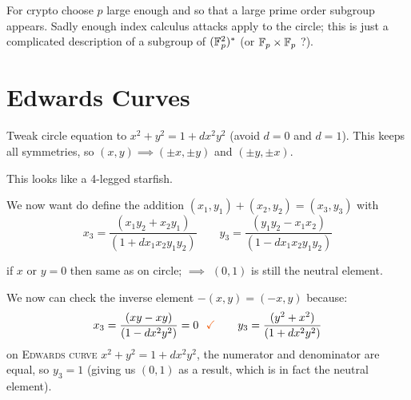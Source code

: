 For crypto choose $p$ large enough and so that a large prime order subgroup appears. Sadly enough index calculus attacks apply to the circle; this is just a complicated description of a subgroup of $(\mathbb{F}_p^2)^{\ast}$ (or $\mathbb{F}_p \times \mathbb{F}_p$ ?).

\section{Edwards Curves}

Tweak circle equation to $x^2 + y^2 = 1 + dx^2y^2$ (avoid $d=0$ and $d=1$). This keeps all symmetries, so $(x,y) \implies (\pm x, \pm y)$ and $(\pm y, \pm x)$.


This looks like a 4-legged starfish.

We now want do define the addition $(x_1,y_1) + (x_2,y_2) = (x_3,y_3)$ with
\[
x_3 = \frac{(x_1y_2 + x_2y_1)}{(1+dx_1x_2y_1y_2)} \qquad y_3 = \frac{(y_1y_2-x_1x_2)}{(1-dx_1x_2y_1y_2)}
\]

if $x$ or $y = 0$ then same as on circle; $\implies$ $(0,1)$ is still the neutral element. 

We now can check the inverse element $-(x,y) = (-x,y)$ because:
\[
x_3 = \frac{(xy - xy)}{(1-dx^2y^2)} = 0 \,\,\,\, \textcolor{ocre}{\checkmark} \qquad y_3 = \frac{(y^2+x^2)}{(1+dx^2y^2)}
\]
on \textsc{Edwards curve} $x^2+y^2 = 1 +dx^2y^2$, the numerator and denominator are equal, so $y_3 = 1$ (giving us $(0,1)$ as a result, which is in fact the neutral element).

